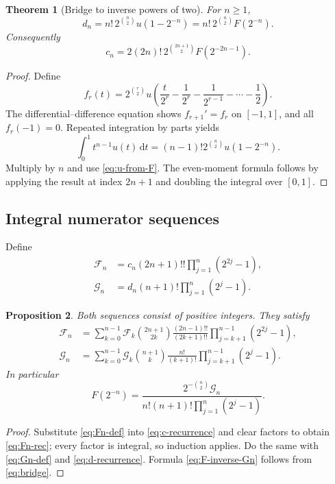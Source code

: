 \documentclass[11pt]{article}
\newtheorem{theorem}{Theorem}[section]
\newtheorem{proposition}[theorem]{Proposition}
\theoremstyle{definition}
\theoremstyle{remark}
\newcommand{\dd}{\,\mathrm d}\newcommand{\e}{\mathrm e}\newcommand{\ii}{\mathrm i}
\begin{document}
\begin{theorem}[Bridge to inverse powers of two]\label{thm:bridge}
For $n\ge1$,
\begin{equation}\label{eq:bridge}
 d_n=n!\,2^{\binom n2}u(1-2^{-n})
 =n!\,2^{\binom n2}F(2^{-n}).
\end{equation}
Consequently
\begin{equation}\label{eq:c-bridge}
 c_n=2(2n)!\,2^{\binom{2n+1}{2}}F(2^{-2n-1}).
\end{equation}
\end{theorem}
\begin{proof}
Define
\[
 f_r(t)=2^{\binom r2}u\!\left(\frac{t}{2^r}-\frac1{2^r}-\frac1{2^{r-1}}-\cdots-\frac12\right).
\]
The differential--difference equation shows $f_{r+1}'=f_r$ on $[-1,1]$, and all $f_r(-1)=0$.  Repeated integration by parts yields
\[
 \int_0^1t^{n-1}u(t)\dd t=(n-1)!2^{\binom n2}u(1-2^{-n}).
\]
Multiply by $n$ and use \eqref{eq:u-from-F}.  The even-moment formula follows by applying the result at index $2n+1$ and doubling the integral over $[0,1]$.
\end{proof}

\subsection{Integral numerator sequences}
Define
\begin{align}
 \mathcal F_n&=c_n(2n+1)!!\prod_{j=1}^{n}(2^{2j}-1),\label{eq:Fn-def}\\
 \mathcal G_n&=d_n(n+1)!\prod_{j=1}^{n}(2^j-1).\label{eq:Gn-def}
\end{align}

\begin{proposition}\label{prop:FG-integral}
Both sequences consist of positive integers.  They satisfy
\begin{align}
 \mathcal F_n&=\sum_{k=0}^{n-1}\mathcal F_k
 \binom{2n+1}{2k}\frac{(2n-1)!!}{(2k+1)!!}
 \prod_{j=k+1}^{n-1}(2^{2j}-1),\label{eq:Fn-rec}\\
 \mathcal G_n&=\sum_{k=0}^{n-1}\mathcal G_k
 \binom{n+1}{k}\frac{n!}{(k+1)!}
 \prod_{j=k+1}^{n-1}(2^j-1).\label{eq:Gn-rec}
\end{align}
In particular
\begin{equation}\label{eq:F-inverse-Gn}
 F(2^{-n})=
 \frac{2^{-\binom n2}\mathcal G_n}
 {n!(n+1)!\prod_{j=1}^{n}(2^j-1)}.
\end{equation}
\end{proposition}
\begin{proof}
Substitute \eqref{eq:Fn-def} into \eqref{eq:c-recurrence} and clear factors to obtain \eqref{eq:Fn-rec}; every factor is integral, so induction applies.  Do the same with \eqref{eq:Gn-def} and \eqref{eq:d-recurrence}.  Formula \eqref{eq:F-inverse-Gn} follows from \eqref{eq:bridge}.
\end{proof}
\end{document}
